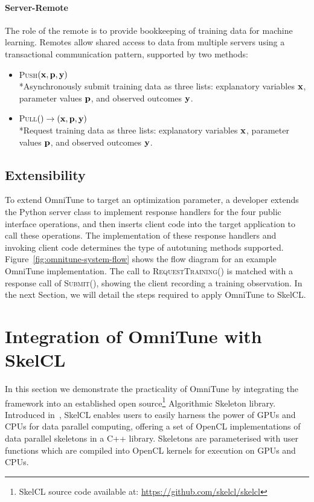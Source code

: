   \paragraph{Server-Remote} The role of the remote is to provide
  bookkeeping of training data for machine learning. Remotes allow
  shared access to data from multiple servers using a transactional
  communication pattern, supported by two methods:
  \begin{itemize}
    \item \textsc{Push}$(\bf{x}, \bf{p}, \bf{y})$\\*Asynchronously submit
    training data as three lists: explanatory variables $\bf{x}$,
    parameter values $\bf{p}$, and observed outcomes $\bf{y}$.
    \item \textsc{Pull}$() \to (\bf{x}, \bf{p}, \bf{y})$\\*Request
    training data as three lists: explanatory variables $\bf{x}$,
    parameter values $\bf{p}$, and observed outcomes $\bf{y}$.
  \end{itemize}


  \subsection{Extensibility}

  To extend OmniTune to target an optimization parameter, a developer
  extends the Python server class to implement response handlers for the four
  public interface operations, and then inserts client code into the
  target application to call these operations. The implementation of
  these response handlers and invoking client code determines the type
  of autotuning methods supported. Figure~\ref{fig:omnitune-system-flow}
  shows the flow diagram for an example OmniTune implementation. The
  call to \textsc{RequestTraining()} is matched with a response call of
  \textsc{Submit()}, showing the client recording a training
  observation. In the next Section, we will detail the steps required to
  apply OmniTune to SkelCL.


  \section{Integration of OmniTune with SkelCL}\label{sec:omnitune-skelcl}

  In this section we demonstrate the practicality of OmniTune by integrating the framework into an established open source\footnote{SkelCL source code available at:  \url{https://github.com/skelcl/skelcl}} Algorithmic Skeleton library. Introduced in~\cite{Steuwer2011}, SkelCL enables users to easily harness the power of GPUs and CPUs for data parallel computing, offering a set of OpenCL implementations of data parallel skeletons in a C++ library. Skeletons are parameterised with user functions which are compiled into OpenCL kernels for execution on GPUs and CPUs.

